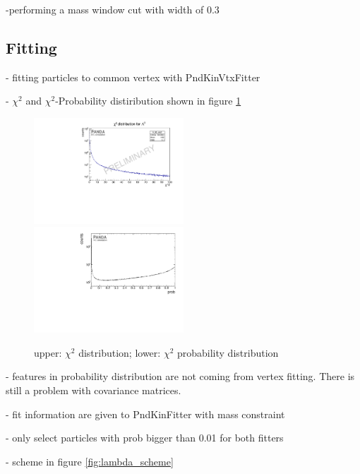 		-performing a mass window cut with width of $0.3$\massunit 
		
		
	\subsection{Fitting}
	
		- fitting particles to common vertex with PndKinVtxFitter
	
		- $\chi^{2}$ and $\chi^{2}$-Probability distiribution shown in figure \ref{fig:lambda_chi2}
		
		\begin{figure}
			\centering
				\includegraphics[width=0.50\textwidth]{./plots/lambda0/lambda0_chisqrt.pdf}
				\includegraphics [width=0.50\textwidth]{./plots/lambda0/lambda0_prob.pdf}
			\caption{upper: $\chi^{2}$ distribution; lower: $\chi^{2}$ probability distribution}
			\label{fig:lambda_chi2}
		\end{figure}
		
		- features in probability distribution are not coming from vertex fitting. There is still a problem with covariance matrices.
		
		- fit information are given to PndKinFitter with mass constraint
		
		- only select particles with prob bigger than 0.01 for both fitters
		
		- scheme in figure \ref{fig:lambda_scheme}
		
